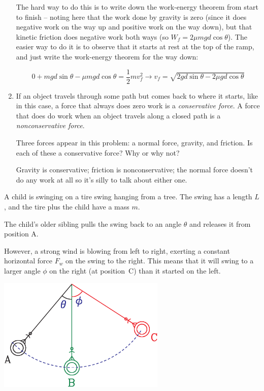 \documentclass[12pt]{article}
\begin{document}
\begin{enumerate}
{\color{Red} The hard way to do this is to write down the work-energy theorem from start to finish -- noting here that the work done by gravity is zero (since it does negative work on the way up and positive work on the way down), but that kinetic friction does negative work both ways (so $W_f = 2 \mu mgd \cos \theta$). The easier way to do it is to observe that it starts at rest at the top of the ramp, and just write the work-energy theorem
	for the way down:
	
	$$0 + mgd \sin \theta - \mu mgd \cos \theta = \frac{1}{2}mv_f^2 \rightarrow v_f = \sqrt{2gd \sin \theta - 2\mu gd \cos \theta}$$
}

\item If an object travels through some path but comes back to where it starts, like in this case, a force that always does zero work is a {\it conservative force}. A force that does do work when an object travels along a closed path is a {\it nonconservative force}.

Three forces appear in this problem: a normal force, gravity, and friction. Is each of these a conservative force? Why or why not?

{\color{Red}Gravity is conservative; friction is nonconservative; the normal force doesn't do any work at all so it's silly to talk about either one.}

\end{enumerate}
\newpage

 
 A child is swinging on a tire swing hanging from a tree. The swing has a length $L$, and the
 	tire plus the child have a mass $m$.
 	
 	The child's older sibling pulls the swing back to an angle $\theta$ and releases it from position A.
 	
 	However, a strong wind is blowing from left to right, exerting a constant horizontal force $F_w$ on the swing to the right. This means that it will swing to a larger angle $\phi$ on the right (at position~C) than it started on the left.




 	\begin{center}
 		\includegraphics[width=0.6\textwidth]{swing-crop.pdf}
 	\end{center}
\end{document}
